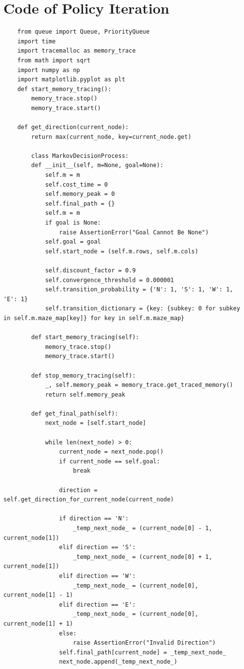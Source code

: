 \documentclass{article}
\begin{document}
\section{Code of Policy Iteration}
\begin{lstlisting}
    from queue import Queue, PriorityQueue
    import time
    import tracemalloc as memory_trace
    from math import sqrt
    import numpy as np
    import matplotlib.pyplot as plt
    def start_memory_tracing():
        memory_trace.stop()
        memory_trace.start()

    def get_direction(current_node):
        return max(current_node, key=current_node.get)

        class MarkovDecisionProcess:
        def __init__(self, m=None, goal=None):
            self.m = m
            self.cost_time = 0
            self.memory_peak = 0
            self.final_path = {}
            self.m = m
            if goal is None:
                raise AssertionError("Goal Cannot Be None")
            self.goal = goal
            self.start_node = (self.m.rows, self.m.cols)
    
            self.discount_factor = 0.9
            self.convergence_threshold = 0.000001
            self.transition_probability = {'N': 1, 'S': 1, 'W': 1, 'E': 1}
            self.transition_dictionary = {key: {subkey: 0 for subkey in self.m.maze_map[key]} for key in self.m.maze_map}
    
        def start_memory_tracing(self):
            memory_trace.stop()
            memory_trace.start()
    
        def stop_memory_tracing(self):
            _, self.memory_peak = memory_trace.get_traced_memory()
            return self.memory_peak
    
        def get_final_path(self):
            next_node = [self.start_node]
    
            while len(next_node) > 0:
                current_node = next_node.pop()
                if current_node == self.goal:
                    break
    
                direction = self.get_direction_for_current_node(current_node)
    
                if direction == 'N':
                    _temp_next_node_ = (current_node[0] - 1, current_node[1])
                elif direction == 'S':
                    _temp_next_node_ = (current_node[0] + 1, current_node[1])
                elif direction == 'W':
                    _temp_next_node_ = (current_node[0], current_node[1] - 1)
                elif direction == 'E':
                    _temp_next_node_ = (current_node[0], current_node[1] + 1)
                else:
                    raise AssertionError("Invalid Direction")
                self.final_path[current_node] = _temp_next_node_
                next_node.append(_temp_next_node_)
    

\end{lstlisting}
\end{document}
